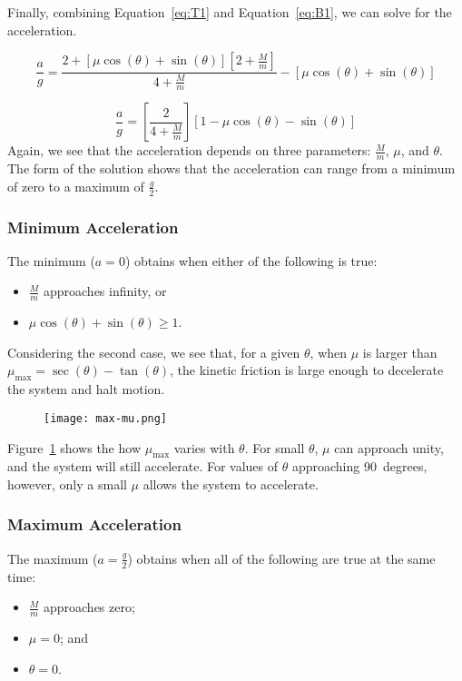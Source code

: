 \documentclass[twocolumn]{article}
\begin{document}
Finally, combining Equation~\ref{eq:T1} and Equation~\ref{eq:B1}, we can solve
for the acceleration.
\begin{small}
\begin{equation*}
   \frac{a}{g} = \frac{2 + [\mu \cos(\theta) + \sin(\theta)][2 +
   \tfrac{M}{m}]}{4 + \tfrac{M}{m}} - [\mu \cos(\theta) + \sin(\theta)]
\end{equation*}
\end{small}
\begin{equation}
   \frac{a}{g} = \left[ \frac{2}{4 + \tfrac{M}{m}} \right] [1 - \mu
   \cos(\theta) - \sin(\theta)]
\end{equation}
Again, we see that the acceleration depends on three parameters:
$\tfrac{M}{m}$, $\mu$, and $\theta$. The form of the solution shows that the
acceleration can range from a minimum of zero to a maximum of $\tfrac{g}{2}$.

\subsubsection{Minimum Acceleration}

The minimum ($a = 0$) obtains when either of the following is true:
\begin{itemize}
   \item $\tfrac{M}{m}$ approaches infinity, or
   \item $\mu \cos(\theta) + \sin(\theta) \geq 1$.
\end{itemize}
Considering the second case, we see that, for a given $\theta$, when $\mu$ is
larger than $\mu_\text{max} = \sec(\theta) - \tan(\theta)$, the kinetic
friction is large enough to decelerate the system and halt motion.
\begin{figure}
   \texttt{[image: max-mu.png]}
   \label{fig:mu-max}
\end{figure}
Figure~\ref{fig:mu-max} shows the how $\mu_\text{max}$ varies with $\theta$.
For small $\theta$, $\mu$ can approach unity, and the system will still
accelerate. For values of $\theta$ approaching 90~degrees, however, only a
small $\mu$ allows the system to accelerate.

\subsubsection{Maximum Acceleration}

The maximum ($a = \tfrac{g}{2}$) obtains when all of the following are true at
the same time:
\begin{itemize}
   \item $\tfrac{M}{m}$ approaches zero;
   \item $\mu = 0$; and
   \item $\theta = 0$.
\end{itemize}
\end{document}
